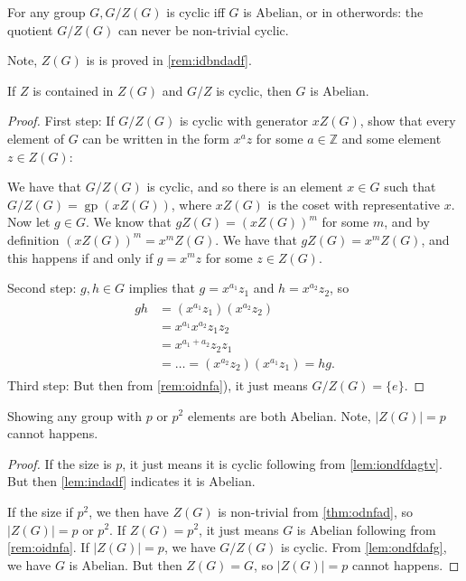 \documentclass{article}
\newcommand{\gp}{\operatorname{gp}}
\begin{document}
\begin{lema}\label{lem:ondfdafg}
For any group $G, G / Z(G)$ is cyclic iff $G$ is Abelian, or in otherwords: the quotient $G / Z(G)$ can never be non-trivial cyclic.
\end{lema}
\begin{rema}
Note, $Z(G)$ is  is proved in \cref{rem:idbndadf}.
\end{rema}
\begin{cora}
If $Z$ is contained in $Z(G)$ and $G / Z$ is cyclic, then $G$ is Abelian.
\end{cora}
\begin{proof}
First step: If $G / Z(G)$ is cyclic with generator $x Z(G)$, show that every element of $G$ can be written in the form $x^{a} z$ for some $a \in \mathbb{Z}$ and some element $z \in Z(G)$:

We have that $G / Z(G)$ is cyclic, and so there is an element $x \in G$ such that $G / Z(G)=\gp(x Z(G))$, where $x Z(G)$ is the coset with representative $x$. Now let $g \in G$.
We know that $g Z(G)=(x Z(G))^{m}$ for some $m$, and by definition $(x Z(G))^{m}=x^{m} Z(G)$.
We have that $g Z(G)=x^{m} Z(G)$, and this happens if and only if  $g=x^{m} z$ for some $z \in Z(G)$.

Second step: 
$g, h \in G$ implies that $g=x^{a_{1}} z_{1}$ and $h=x^{a_{2}} z_{2}$, so
\begin{align*}
\begin{aligned}
g h &=\left(x^{a_{1}} z_{1}\right)\left(x^{a_{2}} z_{2}\right) \\
&=x^{a_{1}} x^{a_{2}} z_{1} z_{2} \\
&=x^{a_{1}+a_{2}} z_{2} z_{1} \\
&=\ldots=\left(x^{a_{2}} z_{2}\right)\left(x^{a_{1}} z_{1}\right)=h g .
\end{aligned}
\end{align*}
Third step:  But then from \cref{rem:oidnfa}), it just means $G/Z(G)=\{e\}$.

\end{proof}
\begin{thma}
Showing any group with $p$ or $p^2$ elements are both Abelian. Note, $|Z(G)|=p$ cannot happens.
\end{thma}
\begin{proof}
If the size is $p$, it just means it is cyclic following from \cref{lem:iondfdagtv}. But then \cref{lem:indadf} indicates it is Abelian.

If the size if $p^2$, we then have $Z(G)$ is non-trivial from \cref{thm:odnfad}, so $|Z(G)|=p$ or $p^2$. If $Z(G)=p^2$, it just means $G$ is Abelian following from \cref{rem:oidnfa}. If $|Z(G)|=p$, we have $G/Z(G)$ is cyclic. From \cref{lem:ondfdafg}, we have $G$ is Abelian. But then $Z(G)=G$, so $|Z(G)|=p$ cannot happens.
\end{proof}
\end{document}
